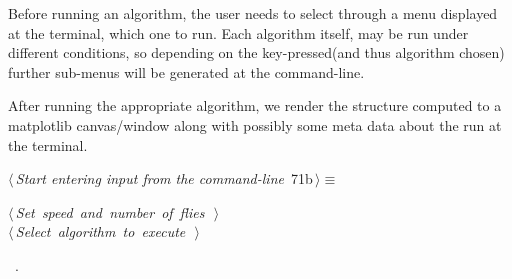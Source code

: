 \documentclass[11.5pt]{report}
\begin{document}
\vspace{-0.8cm}\newchunk Before running an algorithm, the user needs to select through 
a menu displayed at the terminal, which one to run. Each algorithm itself, may be 
run under different conditions, so depending on the key-pressed(and thus algorithm chosen) 
further sub-menus will be generated at the command-line. 

After running the appropriate algorithm, we render the structure computed to a matplotlib canvas/window
along with possibly some meta data about the run at the terminal. 


\begin{flushleft} \small\label{scrap104}\raggedright\small
{} $\langle\,${\itshape Start entering input from the command-line}\nobreak\ {\footnotesize {71b}}$\,\rangle\equiv$
\vspace{-1ex}
\begin{list}{}{} \item
\mbox{}\verb@@\hbox{$\langle\,${\itshape Set speed and number of flies}\nobreak\ {\footnotesize {}}$\,\rangle$}\verb@@\\
\mbox{}\verb@@\hbox{$\langle\,${\itshape Select algorithm to execute}\nobreak\ {\footnotesize {}}$\,\rangle$}\verb@@\\
\mbox{}\verb@@{\NWsep}
\end{list}
\vspace{-1.5ex}
\footnotesize
\begin{list}{}{\setlength{\itemsep}{-\parsep}\setlength{\itemindent}{-\leftmargin}}
\item \NWtxtMacroRefIn\ .

\item{}
\end{list}
\vspace{4ex}
\end{flushleft}
\end{document}

